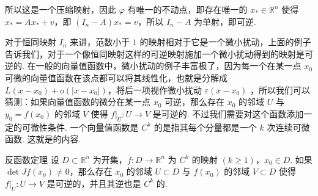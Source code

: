 所以这是一个压缩映射，因此 $\varphi$ 有唯一的不动点，即存在唯一的 $x_*\in \mathbb{R}^n$ 使得 $x_* = Ax_* + v$，即 $(I_n - A)x_* = v$，所以 $I_n - A$ 为单射，即可逆.

对于恒同映射 $I_n$ 来讲，范数小于 $1$ 的映射相对于它是一个\textrm{微小扰动}，上面的例子告诉我们，对于一个像恒同映射这样的可逆映射施加一个微小扰动得到的映射是可逆的. 在一般的向量值函数中，微小扰动的例子丰富极了，因为每一个在某一点 $x_0$ 可微的向量值函数在该点都可以将其线性化，也就是分解成 $L(x - x_0) + o(\vert x - x_0\vert)$，将后一项视作微小扰动 $\varepsilon(x - x_0)$ ，所以我们可以猜测：如果向量值函数的微分在某一点 $x_0$ 可逆，那么存在 $x_0$ 的邻域 $U$ 与 $y_0 = f(x_0)$ 的邻域 $V$ 使得 $\left.f\right|_U: U\to V$ 是可逆的. 不过我们需要对这个函数添加一定的可微性条件. 一个向量值函数是 $C^k$ 的是指其每个分量都是一个 $k$ 次连续可微函数. 这就是的内容.

\begin{theorem}{反函数定理}{}
    设 $D\subset \mathbb{R}^n$ 为开集，$f: D\to\mathbb{R}^n$ 为 $C^{k}$ 的映射 $(k\geqslant 1)$，$x_0\in D$. 如果 $\det Jf(x_0)\neq 0$，那么存在 $x_0$ 的邻域 $U\subset D$ 与 $f(x_0)$ 的邻域 $V\subset D$ 使得 $\left.f\right|_U: U\to V$ 是可逆的，并且其逆也是 $C^k$ 的.
\end{theorem}

